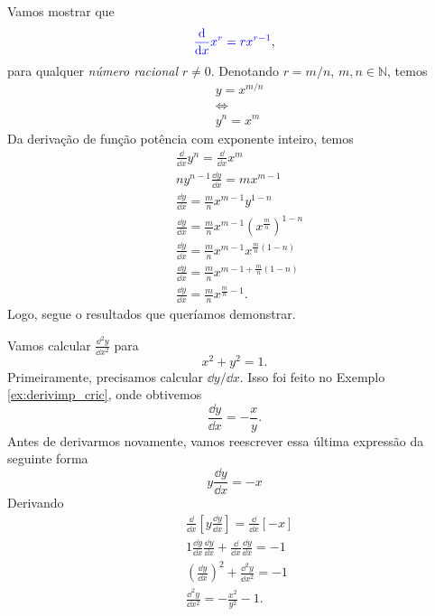 \begin{obs}
  Vamos mostrar que
  \begin{equation}
    {\color{blue}\frac{\mathrm{d}}{\mathrm{d}x}x^r = rx^{r-1}},
  \end{equation}
  para qualquer \emph{número racional} $r\neq 0$. Denotando $r = m/n$, $m,n\in\mathbb{N}$, temos
  \begin{align}
    & y = x^{m/n}\\
    & \Leftrightarrow\\
    & y^n = x^m
  \end{align}
  Da derivação de função potência com exponente inteiro, temos
  \begin{align}
    & \frac{\dd}{\dd x}y^n = \frac{\dd}{\dd x}x^m\\
    & ny^{n-1}\frac{\dd y}{\dd x} = mx^{m-1}\\
    & \frac{\dd y}{\dd x} = \frac{m}{n}x^{m-1}y^{1-n}\\
    & \frac{\dd y}{\dd x} = \frac{m}{n}x^{m-1}\left(x^{\frac{m}{n}}\right)^{1-n}\\
    & \frac{\dd y}{\dd x} = \frac{m}{n}x^{m-1}x^{\frac{m}{n}(1-n)}\\
    & \frac{\dd y}{\dd x} = \frac{m}{n}x^{m-1 + \frac{m}{n}(1-n)}\\
    & \frac{\dd y}{\dd x} = \frac{m}{n}x^{\frac{m}{n}-1}.
  \end{align}
  Logo, segue o resultados que queríamos demonstrar.
\end{obs}

\begin{ex}
  Vamos calcular $\displaystyle \frac{\dd^2 y}{\dd x^2}$ para
  \begin{equation}
    x^2 + y^2 = 1.
  \end{equation}
  Primeiramente, precisamos calcular $\dd y/\dd x$. Isso foi feito no Exemplo \ref{ex:derivimp_cric}, onde obtivemos
  \begin{equation}
    \frac{\dd y}{\dd x} = -\frac{x}{y}.
  \end{equation}
  Antes de derivarmos novamente, vamos reescrever essa última expressão da seguinte forma
  \begin{equation}
    y\frac{\dd y}{\dd x} = -x
  \end{equation}
  Derivando
  \begin{align}
    & \frac{\dd}{\dd x}\left[y\frac{\dd y}{\dd x}\right] = \frac{\dd}{\dd x}\left[-x\right]\\
    & 1\frac{\dd y}{\dd x}\frac{\dd y}{\dd x} + \frac{\dd}{\dd x}\frac{\dd y}{\dd x} = -1\\
    & \left(\frac{\dd y}{\dd x}\right)^2 + \frac{\dd^2 y}{\dd x^2} = -1\\
    & \frac{\dd^2 y}{\dd x^2} = -\frac{x^2}{y^2} - 1.
  \end{align}
\end{ex}

